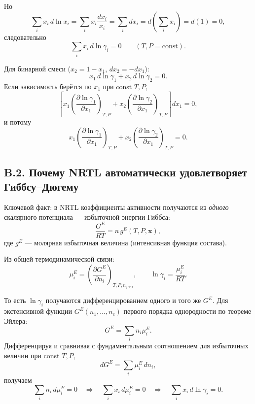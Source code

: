 \documentclass[11pt]{article}
\begin{document}
Но
\begin{equation*}
\sum_i x_i\,d\ln x_i = \sum_i x_i\frac{dx_i}{x_i}=\sum_i dx_i=d\left(\sum_i x_i\right)=d(1)=0,
\end{equation*}
следовательно
\begin{equation*}
\sum_i x_i\,d\ln\gamma_i=0 \qquad (T,P=\text{const}).
\end{equation*}

Для бинарной смеси ($x_2=1-x_1$, $dx_2=-dx_1$):
\begin{equation*}
x_1\,d\ln\gamma_1 + x_2\,d\ln\gamma_2 = 0.
\end{equation*}
Если зависимость берётся по $x_1$ при const $T,P$,
\begin{equation*}
\left[x_1\left(\frac{\partial\ln\gamma_1}{\partial x_1}\right)_{T,P}
+
x_2\left(\frac{\partial\ln\gamma_2}{\partial x_1}\right)_{T,P}\right]dx_1=0,
\end{equation*}
и потому
\begin{equation*}
x_1\left(\frac{\partial\ln\gamma_1}{\partial x_1}\right)_{T,P}
+
x_2\left(\frac{\partial\ln\gamma_2}{\partial x_1}\right)_{T,P}=0.
\end{equation*}

\subsection*{B.2. Почему NRTL автоматически удовлетворяет Гиббсу--Дюгему}

Ключевой факт: в NRTL коэффициенты активности получаются из \emph{одного} скалярного потенциала --- избыточной энергии Гиббса:
\begin{equation*}
\frac{G^E}{RT}=n\,g^E(T,P,\mathbf{x}),
\end{equation*}
где $g^E$ --- молярная избыточная величина (интенсивная функция состава).

Из общей термодинамической связи:
\begin{equation*}
\mu_i^E = \left(\frac{\partial G^E}{\partial n_i}\right)_{T,P,n_{j\neq i}},
\qquad
\ln\gamma_i = \frac{\mu_i^E}{RT}.
\end{equation*}

То есть $\ln\gamma_i$ получаются дифференцированием одного и того же $G^E$. Для экстенсивной функции $G^E(n_1,\dots,n_c)$ первого порядка однородности по теореме Эйлера:
\begin{equation*}
G^E = \sum_i n_i\mu_i^E.
\end{equation*}
Дифференцируя и сравнивая с фундаментальным соотношением для избыточных величин при const $T,P$,
\begin{equation*}
dG^E = \sum_i \mu_i^E\,dn_i,
\end{equation*}
получаем
\begin{equation*}
\sum_i n_i\,d\mu_i^E = 0
\quad\Longrightarrow\quad
\sum_i x_i\,d\mu_i^E =0
\quad\Longrightarrow\quad
\sum_i x_i\,d\ln\gamma_i=0.
\end{equation*}
\end{document}
